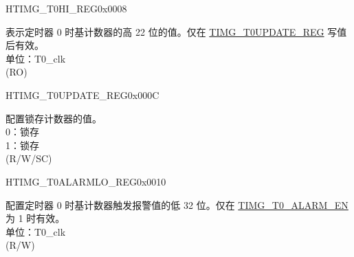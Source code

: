 \begin{register}{H}{TIMG\_T0HI\_REG}{0x0008}\label{regdesc:TIMGTXHIREG}
%
%
\regnewline%
\begin{regdesc}\begin{reglist}
\label{fielddesc:TIMGTXHI}\item [TIMG\_T0\_HI] 表示定时器 0 时基计数器的高 22 位的值。仅在 \hyperref[regdesc:TIMGTXUPDATEREG]{TIMG\_T0UPDATE\_REG} 写值后有效。\\
单位：T0\_clk \\
(RO)
\end{reglist}\end{regdesc}
\end{register}


\begin{register}{H}{TIMG\_T0UPDATE\_REG}{0x000C}\label{regdesc:TIMGTXUPDATEREG}
%
%
\regnewline%
\begin{regdesc}\begin{reglist}
\label{fielddesc:TIMGTXUPDATE}\item [TIMG\_T0\_UPDATE] 配置锁存计数器的值。\\
0：锁存 \\
1：锁存 \\
(R/W/SC)
\end{reglist}\end{regdesc}
\end{register}


\begin{register}{H}{TIMG\_T0ALARMLO\_REG}{0x0010}\label{regdesc:TIMGTXALARMLOREG}
%
\regnewline%
\begin{regdesc}\begin{reglist}
\label{fielddesc:TIMGTXALARMLO}\item [TIMG\_T0\_ALARM\_LO] 配置定时器 0 时基计数器触发报警值的低 32 位。仅在 \hyperref[fielddesc:TIMGTXALARMEN]{TIMG\_T0\_ALARM\_EN} 为 1 时有效。\\
单位：T0\_clk \\
(R/W)
\end{reglist}\end{regdesc}
\end{register}


